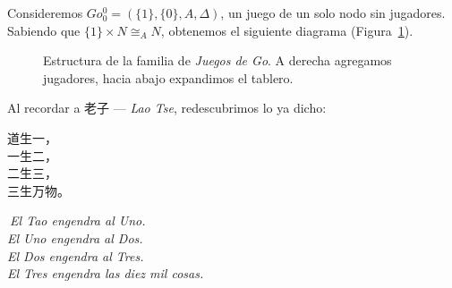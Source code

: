 Consideremos $Go^0_0 = (\{1\}, \{0\}, A, \Delta)$, un juego de un solo nodo sin jugadores. Sabiendo que $\{1\} \times N \cong_A N$, obtenemos el siguiente diagrama (Figura~\ref{fig:familia-go}).
\begin{figure}[H]
	\centering
	\caption{Estructura de la familia de \textit{Juegos de Go}. A derecha agregamos jugadores, hacia abajo expandimos el tablero.}
	\label{fig:familia-go}
\end{figure}
Al recordar a 老子 — \textit{Lao Tse}, redescubrimos lo ya dicho:\\
\noindent
\begin{minipage}[t]{0.35\textwidth}
	\begin{flushright}
		{\large
			\vspace{1pt}
			道生一，\\
			一生二，\\
			二生三，\\
			三生万物。
		}
	\end{flushright}
\end{minipage}%
\hfill
\vrule
\hfill
\begin{minipage}[t]{0.48\textwidth}
	\raggedright
	\vspace{1pt}
	\emph{
		$\ \!\!\!$El Tao engendra al Uno.\\
		El Uno engendra al Dos.\\
		El Dos engendra al Tres.\\
		El Tres engendra las diez mil cosas.}
\end{minipage}

